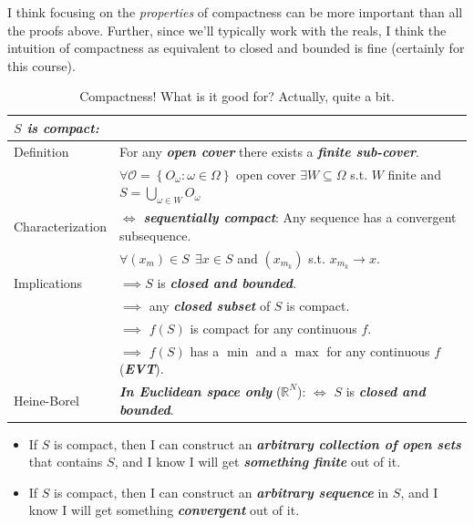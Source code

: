 \documentclass{article}
\newcommand{\keyword}[1]{\textit{\textbf{#1}}\index{#1}}
\theoremstyle{mythm}
\theoremstyle{mydef}
\begin{document}
I think focusing on the \textit{properties} of compactness can be more important than all the proofs above. Further, since we'll typically work with the reals, I think the intuition of compactness as equivalent to closed and bounded is fine (certainly for this course).
\begin{table}[H]
  \centering
  \caption{Compactness! What is it good for? Actually, quite a bit.}
  \begin{tabular}{ll}
  \toprule
  \multicolumn{2}{l}{\itshape $S$ is compact:}  \\\midrule
  Definition       & For any \keyword{open cover} there exists a \keyword{finite sub-cover}. \\
                   & \hspace{1.5em} {\footnotesize $\forall \mathcal{O} = \left\{O_{\omega}: \omega \in \Omega\right\}$ open cover $\exists W \subseteq \Omega$ s.t. $W$ finite and $S = \bigcup_{\omega \in W} O_{\omega}$} \\
  Characterization & $\iff$ \keyword{sequentially compact}: Any sequence has a convergent subsequence. \\
                   & \hspace{1.5em} {\footnotesize $\forall (x_m) \in S ~~ \exists x \in S$ and $(x_{m_k})$ s.t. $x_{m_k} \to x$.} \\
  Implications     & $\implies S$ is \keyword{closed and bounded}. \\
                   & $\implies$ any \keyword{closed subset} of $S$ is compact. \\
                   & $\implies$ $f(S)$ is compact for any continuous $f$. \\
                   & $\implies$ $f(S)$ has a $\min$ and a $\max$ for any continuous $f$ (\keyword{EVT}). \\
  Heine-Borel      & \textbf{\textit{In Euclidean space only}} ($\mathbb{R}^N$): $\iff$ $S$ is \keyword{closed and bounded}.  \\
  \bottomrule
  \end{tabular}
\end{table}

\begin{itemize}
  \item If $S$ is compact, then I can construct an \textbf{\textit{arbitrary collection of open sets}} that contains $S$, and I know I will get \textbf{\textit{something finite}} out of it.

  \item If $S$ is compact, then I can construct an \textbf{\textit{arbitrary sequence}} in $S$, and I know I will get something \textbf{\textit{convergent}} out of it.
\end{itemize}
\end{document}
